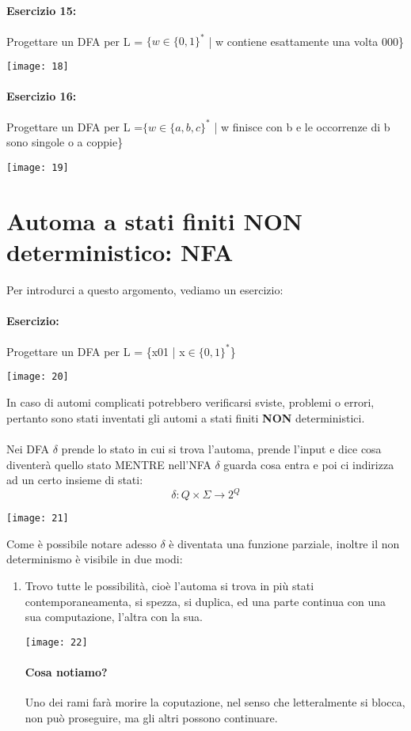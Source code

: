 \documentclass[12pt, a4paper, openany, oneside]{book}
\begin{document}
\paragraph{Esercizio 15: }
Progettare un DFA per L = $\{w \in \{0,1\}^{*}$ | w contiene esattamente una volta
000\}
\begin{center}
\texttt{[image: 18]}
\end{center}
\paragraph{Esercizio 16: }
Progettare un DFA per L =$ \{w \in \{a,b,c\}^{*}$ | w finisce con b e le occorrenze
di b sono singole o a coppie\}
\begin{center}
\texttt{[image: 19]}
\end{center}
\section{Automa a stati finiti NON deterministico: NFA}
Per introdurci a questo argomento, vediamo un esercizio:
\paragraph{Esercizio: }
Progettare un DFA per L = \{x01 | x$\in\{0,1\}^{*}$\}
\begin{center}
\texttt{[image: 20]}
\end{center}
In caso di automi complicati potrebbero verificarsi sviste, problemi o errori, 
pertanto sono stati inventati gli automi a stati finiti \textbf{NON} deterministici.
\\ \\
Nei DFA $\delta$ prende lo stato in cui si trova l'automa, prende l'input e dice
cosa diventerà quello stato MENTRE nell'NFA $\delta$ guarda cosa entra e poi 
ci indirizza ad un certo insieme di stati:
\[
	\delta : Q \times \Sigma \to 2^{Q}
\]
\begin{center}
\texttt{[image: 21]}
\end{center}
Come è possibile notare adesso $\delta$ è diventata una funzione parziale, inoltre
il non determinismo è visibile in due modi:
\begin{enumerate}
	\item Trovo tutte le possibilità, cioè l'automa si trova in più stati 
	contemporaneamenta, si spezza, si duplica, ed una parte continua con una
	sua computazione, l'altra con la sua. 
	\begin{center}
	\texttt{[image: 22]}
	\end{center}
	\paragraph{Cosa notiamo? }Uno dei rami farà morire la coputazione, nel senso
	che letteralmente si blocca, non può proseguire, ma gli altri possono continuare.
	
\end{enumerate}
\end{document}
